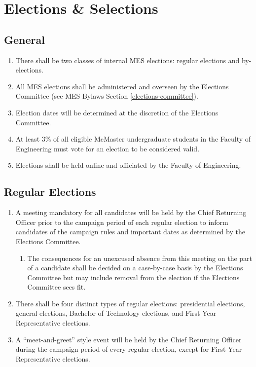 \section{Elections \& Selections}
\label{elections-selections}
\subsection{General}
\label{elections-general}
\begin{enumerate}
 \item
  There shall be two classes of internal MES elections: regular
  elections and by-elections.
 \item
  All MES elections shall be administered and overseen by the Elections
  Committee (see MES Bylaws Section \ref{elections-committee}).
 \item
  Election dates will be determined at the discretion of the Elections
  Committee.
 \item
  At least 3\% of all eligible McMaster undergraduate students in the
  Faculty of Engineering must vote for an election to be considered
  valid.
 \item
  Elections shall be held online and officiated by the Faculty of
  Engineering.

\end{enumerate}

\subsection{Regular Elections}
\label{regular-elections}
\begin{enumerate}
 \item
  A meeting mandatory for all candidates will be held by the Chief
  Returning Officer prior to the campaign period of each regular
  election to inform candidates of the campaign rules and important
  dates as determined by the Elections Committee.

  \begin{enumerate}
   \item
    The consequences for an unexcused absence from this meeting on the
    part of a candidate shall be decided on a case-by-case basis by the
    Elections Committee but may include removal from the election if the
    Elections Committee sees fit.
  \end{enumerate}
 \item
  There shall be four distinct types of regular elections: presidential
  elections, general elections, Bachelor of Technology elections, and
  First Year Representative elections.
 \item
  A ``meet-and-greet'' style event will be held by the Chief Returning
  Officer during the campaign period of every regular election, except
  for First Year Representative elections.


\end{enumerate}

